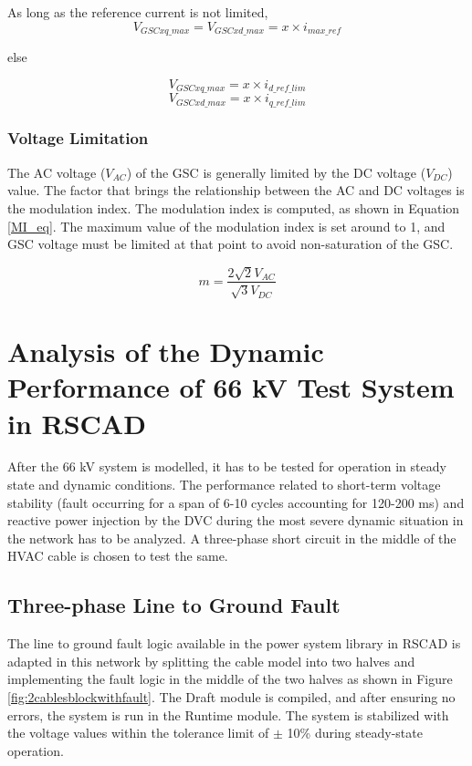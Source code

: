 As long as the reference current is not limited,
\begin{equation}\label{vol_lim_1}
    V_{GSCxq\_max} = V_{GSCxd\_max} = x \times i_{max\_ref}
\end{equation}

else

\begin{equation}\label{vol_lim_2}
    V_{GSCxq\_max} = x \times i_{d\_ref\_lim} 
\end{equation}
\begin{equation}\label{vol_lim_3}
    V_{GSCxd\_max} = x \times i_{q\_ref\_lim}
\end{equation}

\subsubsection{Voltage Limitation}
The \gls{AC} voltage ($V_{AC}$) of the \gls{GSC} is generally limited by the \gls{DC} voltage ($V_{DC}$) value. The factor that brings the relationship between the \gls{AC} and \gls{DC} voltages is the modulation index. The modulation index is computed, as shown in Equation \ref{MI_eq}. The maximum value of the modulation index is set around to 1, and \gls{GSC} voltage must be limited at that point to avoid non-saturation of the \gls{GSC}. 

\begin{equation}\label{MI_eq}
    m = \frac{2\sqrt{2} V_{AC}}{\sqrt{3} {V_{DC}}}
\end{equation}

\section{Analysis of the Dynamic Performance of 66 kV Test System in RSCAD}
After the 66 kV system is modelled, it has to be tested for operation in steady state and dynamic conditions. The performance related to short-term voltage stability (fault occurring for a span of 6-10 cycles accounting for 120-200 ms) and reactive power injection by the \gls{DVC} during the most severe dynamic situation in the network has to be analyzed. A three-phase short circuit in the middle of the \gls{HVAC} cable is chosen to test the same.

\subsection{Three-phase Line to Ground Fault}

The line to ground fault logic available in the power system library in RSCAD is adapted in this network by splitting the cable model into two halves and implementing the fault logic in the middle of the two halves as shown in Figure \ref{fig:2cablesblockwithfault}. %
The Draft module is compiled, and after ensuring no errors, the system is run in the Runtime module. The system is stabilized with the voltage values within the tolerance limit of $\pm$ 10\% during steady-state operation.

